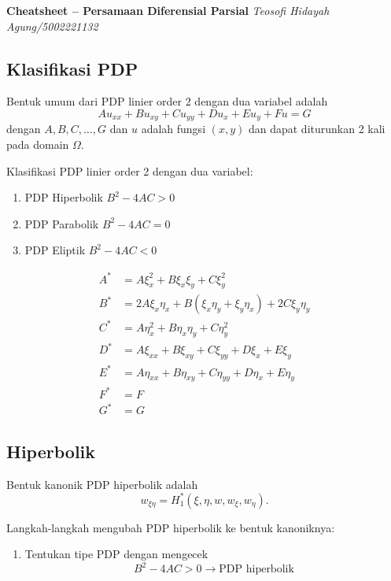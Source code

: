 \documentclass[a4paper,extrafontsizes, 9pt]{memoir}
\begin{document}
\footnotesize \textbf{{Cheatsheet -- Persamaan Diferensial Parsial}} \hfill \textit{Teosofi Hidayah Agung/5002221132}
	\begin{multicols}{3}			
        \subsection*{\small Klasifikasi PDP}
            Bentuk umum dari PDP linier order 2 dengan dua variabel adalah
\begin{equation*}
Au_{xx} + Bu_{xy} + Cu_{yy} + Du_x + Eu_y + Fu = G
\end{equation*}
dengan $A, B, C, \ldots, G$ dan $u$ adalah fungsi $(x, y)$ dan dapat diturunkan 2 kali pada domain $\Omega$.

Klasifikasi PDP linier order 2 dengan dua variabel:
\begin{enumerate}
    \item PDP Hiperbolik \hfill $B^2 - 4AC > 0$
    \item PDP Parabolik \hfill $B^2 - 4AC = 0$
    \item PDP Eliptik \hfill $B^2 - 4AC < 0$
\end{enumerate}
\begin{align*}
A^* &= A \xi_x^2 + B \xi_x \xi_y + C \xi_y^2 \\
B^* &= 2A \xi_x \eta_x + B \left( \xi_x \eta_y + \xi_y \eta_x \right) + 2C \xi_y \eta_y \\
C^* &= A \eta_x^2 + B \eta_x \eta_y + C \eta_y^2 \\
D^* &= A \xi_{xx} + B \xi_{xy} + C \xi_{yy} + D \xi_x + E \xi_y \\
E^* &= A \eta_{xx} + B \eta_{xy} + C \eta_{yy} + D \eta_x + E \eta_y \\
F^* &= F \\
G^* &= G
\end{align*}
            \subsection*{\small Hiperbolik}
                Bentuk kanonik PDP hiperbolik adalah
\[
w_{\xi \eta} = H^*_1(\xi, \eta, w, w_\xi, w_\eta).
\]

Langkah-langkah mengubah PDP hiperbolik ke bentuk kanoniknya:

\begin{enumerate}
    \item Tentukan tipe PDP dengan mengecek
    \[
    B^2 - 4AC > 0 \rightarrow \text{PDP hiperbolik}
    \]


\end{enumerate}
\end{multicols}
\end{document}
